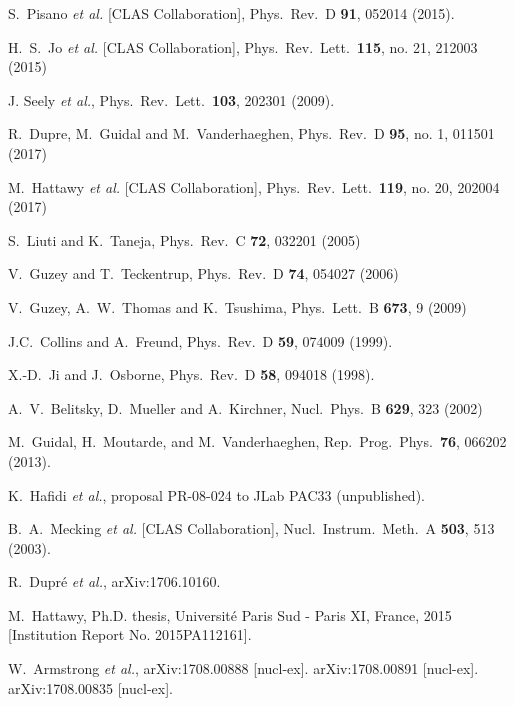 \documentclass[twocolumn,nofootinbib,showpacs,prl,superscriptaddress,secnumarabic,amssymb,nobibnotes,aps,floatfix]{revtex4}
\begin{document}
\begin{thebibliography}{99}
S.~Pisano {\it et al.} [CLAS Collaboration],
Phys.\ Rev.\ D {\bf 91}, 052014 (2015).

 H.~S.~Jo {\it et al.} [CLAS Collaboration],
  Phys.\ Rev.\ Lett.\  {\bf 115}, no. 21, 212003 (2015)

J. Seely {\it et al.}, Phys.\ Rev.\ Lett.\ {\bf 103}, 202301 (2009).


 R.~Dupre, M.~Guidal and M.~Vanderhaeghen,
 Phys.\ Rev.\ D {\bf 95}, no. 1, 011501 (2017)

   M.~Hattawy {\it et al.} [CLAS Collaboration],
   Phys.\ Rev.\ Lett.\  {\bf 119}, no. 20, 202004 (2017)


S.~Liuti and K.~Taneja, Phys.\ Rev.\ C {\bf 72}, 032201 (2005)

 V.~Guzey and T.~Teckentrup, Phys.\ Rev.\ D {\bf 74}, 
   054027 (2006)

 V.~Guzey, A.~W.~Thomas and K.~Tsushima,
  Phys.\ Lett.\ B {\bf 673}, 9 (2009)

J.C.~Collins and A.~Freund, Phys.\ Rev.\ D {\bf 59}, 074009 (1999).

   X.-D.~Ji and J.~Osborne, Phys.\ Rev.\ D {\bf 58}, 094018 (1998).

A.~V.~Belitsky, D.~Mueller and A.~Kirchner,
Nucl.\ Phys.\ B {\bf 629}, 323 (2002)

 M.~Guidal, H.~Moutarde, and M.~Vanderhaeghen,
Rep.\ Prog.\ Phys.\  {\bf 76}, 066202 (2013).


 K.~Hafidi {\it et al.},
   proposal PR-08-024 to JLab PAC33 (unpublished).

 B.~A.~Mecking {\it et al.} [CLAS Collaboration],
   Nucl.\ Instrum.\ Meth.\ A {\bf 503}, 513 (2003).

 R.~Dupr\'e {\it et al.},
  arXiv:1706.10160.

M.~Hattawy, Ph.D. thesis, Universit{\'e} Paris Sud - Paris XI, France, 2015 
[Institution Report No. 2015PA112161].

 W.~Armstrong {\it et al.},
     arXiv:1708.00888 [nucl-ex].
       arXiv:1708.00891 [nucl-ex].
         arXiv:1708.00835 [nucl-ex].





\end{thebibliography}
\end{document}
